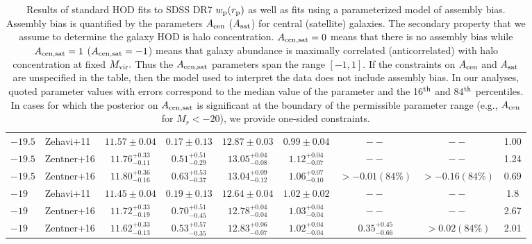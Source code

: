 \documentclass[usenatbib,usegraphicx,letterpaper]{mn2e}
\newcommand{\mvir}{M_{\rm vir}}
\newcommand{\magr}{M_r}
\begin{document}
\begin{table}
{\begin{tabular}{l l c c c c c c c}
$-19.5$ & Zehavi+11 & $11.57 \pm 0.04$ & $0.17 \pm 0.13$ & $12.87 \pm 0.03$ & $0.99 \pm 0.04$ & $--$ & $--$ & 1.00 \\
$-19.5$ & Zentner+16 & $11.76^{+0.33}_{-0.11}$ & $0.51^{+0.51}_{-0.29}$ & $13.05^{+0.04}_{-0.08}$ & $1.12^{+0.04}_{-0.07}$ & $--$ & $--$ & 1.24\\
$-19.5$ & Zentner+16 & $11.80^{+0.36}_{-0.16}$ & $0.63^{+0.53}_{-0.37}$ & $13.04^{+0.09}_{-0.12}$ & $1.06^{+0.07}_{-0.10}$ & $>-0.01 (84\%)$ & $>-0.16 (84\%)$ & 0.69 \vspace*{5pt}\\
%
$-19$ & Zehavi+11 & $11.45 \pm 0.04$ & $0.19 \pm 0.13$ & $12.64 \pm 0.04$ & $1.02 \pm 0.02$ & $--$ & $--$ & 1.8 \\
$-19$ & Zentner+16 & $11.72^{+0.33}_{-0.19}$ & $0.70^{+0.51}_{-0.45}$ & $12.78^{+0.04}_{-0.04}$ & $1.03^{+0.04}_{-0.04}$ & $--$ & $--$ & 2.67\\
$-19$ & Zentner+16 & $11.62^{+0.33}_{-0.13}$ & $0.53^{+0.57}_{-0.35}$ & $12.83^{+0.06}_{-0.07}$ & $1.02^{+0.04}_{-0.04}$ & $0.35^{+0.45}_{-0.66}$ & $>0.02 (84\%)$ & 2.01\\
\hline
\end{tabular}
\medskip
\caption{
Results of standard HOD fits to SDSS DR7 $w_{\rm p}(r_{\rm p})$ as well as
fits using a parameterized model of assembly bias.
Assembly bias is quantified by the parameters $A_{\rm cen}$ ($A_{\rm sat}$) for central (satellite) galaxies. The secondary
property that we assume to determine the galaxy HOD is halo concentration. $A_{\rm cen,sat}=0$ means that there is no
assembly bias while $A_{\rm cen,sat}=1$ ($A_{\rm cen,sat}=-1$) means that galaxy abundance is maximally
correlated (anticorrelated) with halo concentration at fixed $\mvir.$
Thus the $A_{\rm cen,sat}$ parameters span the range $[-1, 1].$
If the constraints on $A_{\rm cen}$ and $A_{\rm sat}$ are unspecified in the table, 
then the model used to interpret the data
does not include assembly bias. In our analyses, quoted parameter values with errors correspond to the median
value of the parameter and the 16$^{\rm th}$ and 84$^{\rm th}$ percentiles. In cases for which the posterior
on $A_{\rm cen,sat}$ is significant at the boundary of the permissible parameter range (e.g., $A_{\rm cen}$ for $\magr < -20$), 
we provide one-sided constraints.
}
}
 \label{table:parameters}
\end{table}
\end{document}
